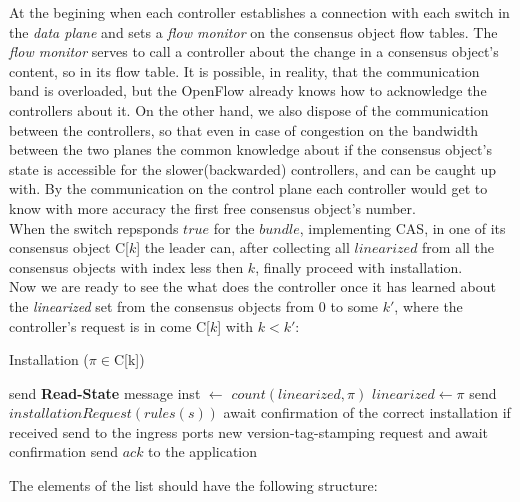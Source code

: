\documentclass{article}
\theoremstyle{remark}
\begin{document}
%
At the begining when each controller establishes a connection with each switch in the \emph{data plane} and sets a \emph{flow monitor} on the consensus object flow tables. The \emph{flow monitor} serves to call a controller about the change in a consensus object's content, so in its flow table. It is possible, in reality, that the communication band is overloaded, but the OpenFlow already knows how to acknowledge the controllers about it. On the other hand, we also dispose of the communication between the controllers, so that even in case of congestion on the bandwidth between the two planes the common knowledge about if the consensus object's state is accessible for the slower(backwarded) controllers, and can be caught up with.
By the communication on the control plane each controller would get to know with more accuracy the first free consensus object's number.
\\ 
When  the switch repsponds $true$ for the $bundle$, implementing CAS, in one of its  consensus object C[$k$] the leader can, after collecting all $linearized$ from all the consensus objects with index less then $k$, finally proceed with installation.\\
Now we are ready to see the what does the controller once it has learned about the \emph{linearized} set from the consensus objects from 0 to some $k'$, where the controller's request is in come C[$k$] with $k<k'$:
\begin{algorithm}
 \caption{Installation ($\pi\in$C[k])}
 \begin{algorithmic}[1]\label{Inst}
 	\State send \textbf{Read-State} message
 \EndFor
 \State inst $\gets$ $count(linearized, \pi)$
 	\State $linearized\gets \pi$
 	  send $installationRequest(rules(s))$
 	\EndFor
 	\State await confirmation of the correct installation
 	\State if received send to the ingress ports new version-tag-stamping request and await confirmation
 	\State send $ack$ to the application
 \EndIf
 \end{algorithmic}
\end{algorithm}
The elements of the list should have the following structure:\\
\end{document}
